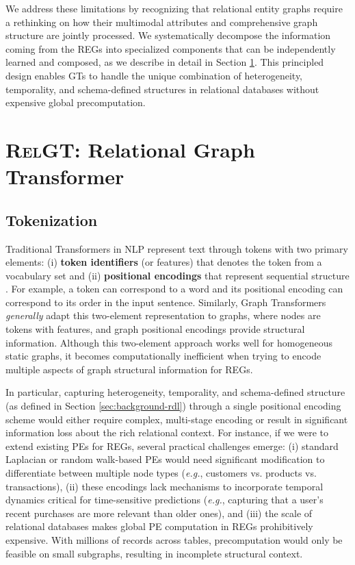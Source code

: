 \documentclass{article} %
\newcommand{\RelGT}{\textsc{RelGT}\xspace}
\begin{document}
We address these limitations by recognizing that relational entity graphs require a rethinking on how their multimodal attributes and comprehensive graph structure are jointly processed. We systematically decompose the information coming from the REGs into specialized components that can be independently learned and composed, as we describe in detail in Section \ref{sec:method-relgt}. This principled design enables GTs to handle the unique combination of heterogeneity, temporality, and schema-defined structures in relational databases without expensive global precomputation.



\section{\RelGT: Relational Graph Transformer}
\label{sec:method-relgt}

\subsection{Tokenization}
\label{sec:method-tokenization}

Traditional Transformers in NLP represent text through tokens with two primary elements: (i) \textbf{token identifiers} (or features) that denotes the token from a vocabulary set and (ii) \textbf{positional encodings} that represent sequential structure \citep{vaswani2017attention}. For example, a token can correspond to a word and its positional encoding can correspond to its order in the input sentence. Similarly, Graph Transformers \textit{generally} adapt this two-element representation to graphs, where nodes are tokens with features, and graph positional encodings provide structural information. 
Although this two-element approach works well for homogeneous static graphs, it becomes computationally inefficient when trying to encode multiple aspects of graph structural information for REGs. 

In particular, capturing heterogeneity, temporality, and schema-defined structure (as defined in Section \ref{sec:background-rdl}) through a single positional encoding scheme would either require complex, multi-stage encoding or result in significant information loss about the rich relational context. 
For instance, if we were to extend existing PEs for REGs, several practical challenges emerge: (i) standard Laplacian or random walk-based PEs would need significant modification to differentiate between multiple node types (\textit{e.g.}, customers vs. products vs. transactions), (ii) these encodings lack mechanisms to incorporate temporal dynamics critical for time-sensitive predictions (\textit{e.g.}, capturing that a user's recent purchases are more relevant than older ones), and (iii) the scale of relational databases makes global PE computation in REGs prohibitively expensive. With millions of records across tables, precomputation would only be feasible on small subgraphs, resulting in incomplete structural context.
\end{document}
